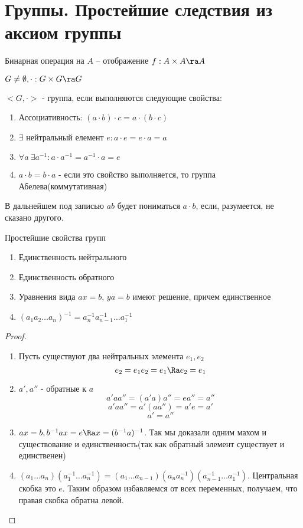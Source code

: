 \section{Группы. Простейшие следствия из аксиом группы}
\begin{Def}
	Бинарная операция на $A$ -- отображение $f : A \times A \ra A$
\end{Def}
$G \neq \emptyset, \cdot : G \times G \ra G$

$<G, \cdot > $ - группа, если выполняются следующие свойства:
\begin{enumerate}
	\item Ассоциативность: $(a \cdot b) \cdot c = a \cdot (b \cdot c)$		
	\item $\exists$ нейтральный елемент $e : a \cdot e = e \cdot a = a$
	\item $\forall a \: \exists a^{-1} : a \cdot a^{-1} = a^{-1} \cdot a = e$		
	\item $a \cdot b = b \cdot a$ - если это свойство выполняется, то группа Абелева(коммутативная) 
\end{enumerate}

В дальнейшем под записью $ab$ будет пониматься $a \cdot b$, если, разумеется, не сказано другого.     \\
	
\begin{theorem}{Простейшие свойства групп}
	\begin{enumerate}
		\item Единственность нейтрального
		\item Единственность обратного
		\item 
			Уравнения вида $ax=b$, $ya=b$ имеют решение, причем единственное
		\item $(a_1 a_2 \dots a_n)^{-1} = a_n^{-1} a_{n-1}^{-1} \dots a_1^{-1}$
   	\end{enumerate}
\end{theorem}
\begin{proof}
	\begin{enumerate}
		\item
			Пусть существуют два нейтральных элемента $e_1, e_2$
			$$e_2 = e_1 e_2 = e_1 \Ra e_2 = e_1$$
		\item
			$a', a''$ - обратные к $a$
			$$a'aa'' = (a'a)a''= ea'' = a''$$
			$$a'aa'' = a'(aa'') = a'e = a'$$
			$$a' = a''$$
		\item
			$ax = b, b^{-1}ax = e \Ra x = (b^{-1}a)^{-1}$.
			Так мы доказали одним махом и существование и единственность(так как обратный элемент существует и единственен)
		\item
			$(a_1 \dots a_n) (a_1^{-1} \dots a_n^{-1}) = (a_1 \dots a_{n-1})(a_n a_n^{-1})(a_{n-1}^{-1} \dots a_1^{-1})$.
			Центральная скобка это $e$. Таким образом избавляемся от всех переменных, получаем, что правая скобка обратна левой. 
	\end{enumerate}
\end{proof}
	
